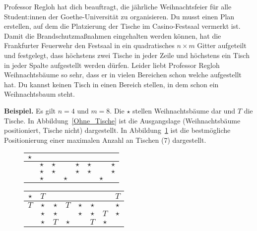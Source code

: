 \documentclass{uebung_cs}
\begin{document}
\begin{aufgabe}[Weihnachtsbäume]
    Professor Regloh hat dich beauftragt, die jährliche Weihnachtsfeier für alle Student:innen der Goethe-Universität zu organisieren. Du musst einen Plan erstellen, auf dem die Platzierung der Tische im Casino-Festsaal vermerkt ist. Damit die Brandschutzmaßnahmen eingehalten werden können, hat die Frankfurter Feuerwehr den Festsaal in ein quadratisches $n \times m$ Gitter aufgeteilt und festgelegt, dass höchstens zwei Tische in jeder Zeile und höchstens ein Tisch in jeder Spalte aufgestellt werden dürfen. Leider liebt Professor Regloh Weihnachtsbäume so sehr, dass er in vielen Bereichen schon welche aufgestellt hat. Du kannst keinen Tisch in einen Bereich stellen, in dem schon ein Weihnachtsbaum steht.
    
    \textbf{Beispiel.} Es gilt $n = 4$ und $m = 8$. Die $\star$ stellen Weihnachtsbäume dar und $T$ die Tische. In Abbildung~\ref{Ohne_Tische} ist die Ausgangslage (Weihnachtsbäume positioniert, Tische nicht) dargestellt. In Abbildung~\ref{Mit Tischen} ist die bestmögliche Positionierung einer maximalen Anzahl an Tischen (7) dargestellt.
   
    \begin{figure}[h]
    \centering
    \begin{minipage}{0.4\textwidth}
    	\begin{tabular}{|c|c|c|c|c|c|c|c|}
    		\hline 
			$\star$ &  &  &  &  &  &  &  \\ 
    		\hline 
	    	& $\star$ & $\star$ &  & $\star$ & $\star$ &  & $\star$ \\ 
	    	\hline 
		    & $\star$ & $\star$ &  & $\star$ & $\star$ &  & $\star$ \\ 
    		\hline 
		    & $\star$ &  & $\star$ &  &  & $\star$ &  \\ 
    		\hline 
    	\end{tabular}
    	\caption{\label{Ohne_Tische}}
    \end{minipage}
    \begin{minipage}{0.4\textwidth}
    	\begin{tabular}{|c|c|c|c|c|c|c|c|}
		    \hline 
    		$\star$ & $T$ &  &  &  &  &  & $T$ \\ 
	    	\hline 
	    	$T$ & $\star$ & $\star$ & $T$ & $\star$ & $\star$ &  & $\star$ \\ 
		    \hline 
    		& $\star$ & $\star$ &  & $\star$ & $\star$ & $T$ & $\star$ \\ 
		    \hline 
    		& $\star$ & $T$ & $\star$ &  & $T$ & $\star$ &  \\ 
	    	\hline 
    	\end{tabular}
    	\caption{\label{Mit Tischen}}
    \end{minipage}
    \end{figure}
     

\end{aufgabe}
\end{document}
